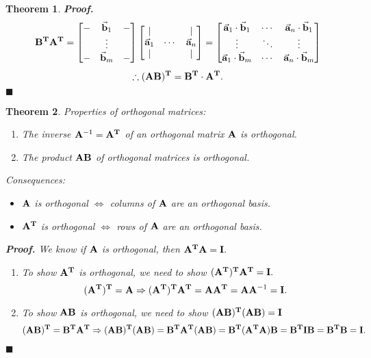 \documentclass[12pt, a4paper]{article}
\newtheorem{thm}{Theorem}[subsection]
\newenvironment*{prf}{\par\indent\textbf{\textit{Proof. }}}{\hfill $\blacksquare$\par}
\def\T{{\vb{T}}}
\def\veca{\va{a}}
\def\vecb{\va{b}}
\def\matrixA{\vb{A}}
\def\matrixB{\vb{B}}
\def\matrixI{\vb{I}}
\begin{document}
\begin{thm}
\begin{prf}
		\[\matrixB^\T\matrixA^\T=\begin{bmatrix}-&\vecb_1&-\\&\vdots&\\-&\vecb_m&-\end{bmatrix}\begin{bmatrix}|&&|\\\veca_1&\cdots&\veca_n\\|&&|\end{bmatrix}=\begin{bmatrix}\veca_1\cdot\vecb_1&\cdots&\veca_n\cdot\vecb_1\\\vdots&\ddots&\vdots\\\veca_1\cdot\vecb_m&\cdots&\veca_n\cdot\vecb_m\end{bmatrix}\]
		\[\therefore(\matrixA\matrixB)^\T=\matrixB^\T\cdot\matrixA^\T.\]
	\end{prf}
\end{thm}
\begin{thm}
	Properties of orthogonal matrices:
	\begin{enumerate}
		\item The inverse $\matrixA^{-1}=\matrixA^\T$ of an orthogonal matrix $\matrixA$ is orthogonal. 
		\item The product $\matrixA\matrixB$ of orthogonal matrices is orthogonal. 	
	\end{enumerate}
	Consequences: 
	\begin{itemize}
		\item $\matrixA$ is orthogonal $\Longleftrightarrow$ columns of $\matrixA$ are an orthogonal basis.
		\item $\matrixA^\T$ is orthogonal $\Longleftrightarrow$ rows of $\matrixA$ are an orthogonal basis. 
	\end{itemize}
	\begin{prf}
		We know if $\matrixA$ is orthogonal, then $\matrixA^\T\matrixA=\matrixI.$
		\begin{enumerate}
			\item To show $\matrixA^\T$ is orthogonal, we need to show $(\matrixA^\T)^\T\matrixA^\T=\matrixI.$ \[(\matrixA^\T)^\T=\matrixA\Rightarrow(\matrixA^\T)^\T\matrixA^\T=\matrixA\matrixA^\T=\matrixA\matrixA^{-1}=\matrixI.\]
			\item To show $\matrixA\matrixB$ is orthogonal, we need to show $(\matrixA\matrixB)^\T(\matrixA\matrixB)=\matrixI$ \[(\matrixA\matrixB)^\T=\matrixB^\T\matrixA^\T\Rightarrow(\matrixA\matrixB)^\T(\matrixA\matrixB)=\matrixB^\T\matrixA^\T(\matrixA\matrixB)=\matrixB^\T(\matrixA^\T\matrixA)\matrixB=\matrixB^\T\matrixI\matrixB=\matrixB^\T\matrixB=\matrixI.\]
		\end{enumerate}
	\end{prf}
\end{thm}
\end{document}
